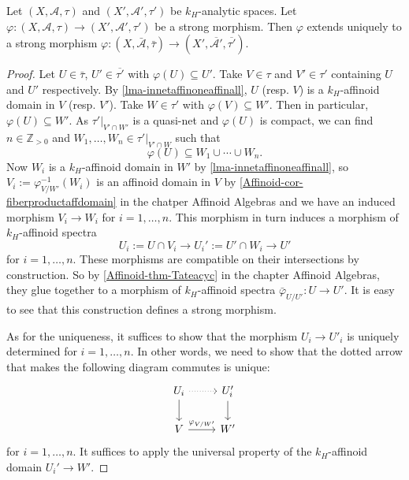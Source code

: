 \begin{proposition}\label{prop-strongmorphismext}
    Let $(X,\mathcal{A},\tau)$ and $(X',\mathcal{A}',\tau')$ be $k_H$-analytic spaces. Let $\varphi:(X,\mathcal{A},\tau)\rightarrow (X',\mathcal{A}',\tau')$ be a strong morphism. Then $\varphi$ extends uniquely to a strong morphism $\varphi:(X,\bar{\mathcal{A}},\bar{\tau})\rightarrow (X',\overline{\mathcal{A}'},\overline{\tau'})$.
\end{proposition}
\begin{proof}
    Let $U\in \bar{\tau}$, $U'\in \overline{\tau'}$ with $\varphi(U)\subseteq U'$. Take $V\in \tau$ and $V'\in \tau'$ containing $U$ and $U'$ respectively. By \cref{lma-innetaffinoneaffinall}, $U$ (resp. $V$) is a $k_H$-affinoid domain in $V$ (resp. $V'$). Take $W\in \tau'$ with $\varphi(V)\subseteq W'$. Then in particular, $\varphi(U)\subseteq W'$. As $\tau'|_{V'\cap W'}$ is a quasi-net and $\varphi(U)$ is compact, we can find $n\in \mathbb{Z}_{>0}$ and $W_1,\ldots,W_n\in \tau'|_{V'\cap W}$ such that 
    \[
        \varphi(U)\subseteq W_1\cup\cdots\cup W_n.
    \]
    Now $W_i$ is a $k_H$-affinoid domain in $W'$ by \cref{lma-innetaffinoneaffinall}, so $V_i:=\varphi^{-1}_{V/W'}(W_i)$ is an affinoid domain in $V$ by \cref{Affinoid-cor-fiberproductaffdomain} in the chatper Affinoid Algebras and we have an induced morphism $V_i\rightarrow W_i$ for $i=1,\ldots,n$. This morphism in turn induces a morphism of $k_H$-affinoid spectra
    \[
        U_i:=U\cap V_i\rightarrow U_i':=U'\cap W_i  \rightarrow U'
    \]
    for $i=1,\ldots,n$. These morphisms are compatible on their intersections by construction. So by \cref{Affinoid-thm-Tateacyc} in the chapter Affinoid Algebras, they glue together to a morphism of $k_H$-affinoid spectra $\bar{\varphi}_{U/U'}:U\rightarrow U'$. It is easy to see that this construction defines a strong morphism.

    As for the uniqueness, it suffices to show that the morphism $U_i\rightarrow U'_i$ is uniquely determined for $i=1,\ldots,n$. In other words, we need to show that the dotted arrow that makes the following diagram commutes is unique:
    \[
        \begin{tikzcd}
            U_i \arrow[d] \arrow[r, dotted] & U'_i \arrow[d] \\
            V \arrow[r, "\varphi_{V/W'}"]   & W'            
        \end{tikzcd}  
    \]
    for $i=1,\ldots,n$.
    It suffices to apply the universal property of the $k_H$-affinoid domain $U_i'\rightarrow W'$.
\end{proof}

